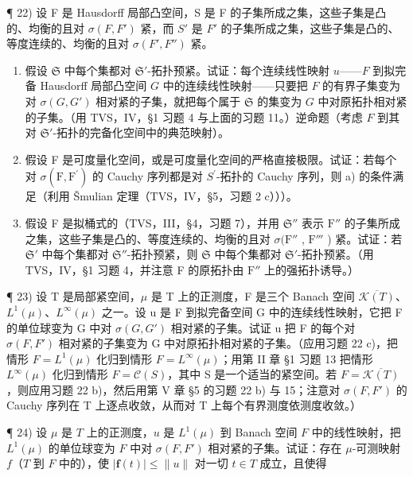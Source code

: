 ¶ 22) 设 F 是 Hausdorff 局部凸空间，S 是 F 的子集所成之集，这些子集是凸的、均衡的且对 \(\sigma(F, F')\) 紧，而 \(S'\) 是 \(F'\) 的子集所成之集，这些子集是凸的、等度连续的、均衡的且对 \(\sigma(F', F'')\) 紧。

\begin{enumerate}
\def\labelenumi{\alph{enumi})}
\item
  假设 \(\mathfrak{S}\) 中每个集都对 \(\mathfrak{S}'\)-拓扑预紧。试证：每个连续线性映射 \(u\)——\(F\) 到拟完备 Hausdorff 局部凸空间 \(G\) 中的连续线性映射——只要把 \(F\) 的有界子集变为对 \(\sigma(G, G')\) 相对紧的子集，就把每个属于 \(\mathfrak{S}\) 的集变为 \(G\) 中对原拓扑相对紧的子集。（用 TVS，IV，§1 习题 4 与上面的习题 11。）逆命题（考虑 \(F\) 到其对 \(\mathfrak{S}'\)-拓扑的完备化空间中的典范映射）。
\item
  假设 F 是可度量化空间，或是可度量化空间的严格直接极限。试证：若每个对 \(\sigma(\mathrm{F},\mathrm{F}^{\prime})\) 的 Cauchy 序列都是对 \(S^{\prime}\)-拓扑的 Cauchy 序列，则 a) 的条件满足（利用 Šmulian 定理（TVS，IV，§5，习题 2 c）））。
\item
  假设 F 是拟桶式的（TVS，III，§4，习题 7），并用 \(\mathfrak{S}''\) 表示 \(\mathrm{F}''\) 的子集所成之集，这些子集是凸的、等度连续的、均衡的且对 \(\sigma(\mathrm{F}''\) , \(\mathrm{F}'''\) ) 紧。试证：若 \(\mathfrak{S}'\) 中每个集都对 \(\mathfrak{S}''\)-拓扑预紧，则 \(\mathfrak{S}\) 中每个集都对 \(\mathfrak{S}'\)-拓扑预紧。（用 TVS，IV，§1 习题 4，并注意 F 的原拓扑由 \(\mathrm{F}''\) 上的强拓扑诱导。）
\end{enumerate}

¶ 23) 设 T 是局部紧空间，\(\mu\) 是 T 上的正测度，F 是三个 Banach 空间 \(\overline{\mathcal{K}(T)}\)、\(L^1(\mu)\)、\(L^\infty(\mu)\) 之一。设 u 是 F 到拟完备空间 G 中的连续线性映射，它把 F 的单位球变为 G 中对 \(\sigma(G, G')\) 相对紧的子集。试证 u 把 F 的每个对 \(\sigma(F, F')\) 相对紧的子集变为 G 中对原拓扑相对紧的子集。（应用习题 22 c)，把情形 \(F = L^1(\mu)\) 化归到情形 \(F = L^\infty(\mu)\)；用第 II 章 §1 习题 13 把情形 \(L^\infty(\mu)\) 化归到情形 \(F = \mathcal{C}(S)\)，其中 S 是一个适当的紧空间。若 \(F = \overline{\mathcal{K}(T)}\)，则应用习题 22 b)，然后用第 V 章 §5 的习题 22 b) 与 15；注意对 \(\sigma(F, F')\) 的 Cauchy 序列在 T 上逐点收敛，从而对 T 上每个有界测度依测度收敛。）

¶ 24) 设 \(\mu\) 是 \(T\) 上的正测度，\(u\) 是 \(L^1(\mu)\) 到 Banach 空间 \(F\) 中的线性映射，把 \(L^1(\mu)\) 的单位球变为 \(F\) 中对 \(\sigma(F, F')\) 相对紧的子集。试证：存在 \(\mu\)-可测映射 \(f\)（\(T\) 到 \(F\) 中的），使 \(|\mathbf{f}(t)| \leqslant \|u\|\) 对一切 \(t \in T\) 成立，且使得

